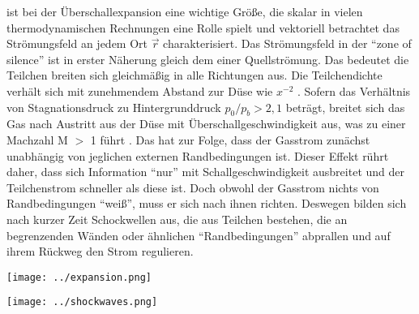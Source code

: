 ist bei der Überschallexpansion eine wichtige Größe, die skalar in vielen thermodynamischen Rechnungen eine Rolle spielt und vektoriell betrachtet das Strömungsfeld an jedem Ort $\vec{r}$ charakterisiert. Das Strömungsfeld in der \enquote{zone of silence} ist in erster Näherung gleich dem einer Quellströmung. Das bedeutet die Teilchen breiten sich gleichmäßig in alle Richtungen aus. Die Teilchendichte verhält sich mit zunehmendem Abstand zur Düse wie $x^{-2}$ \cite{hagena1981nucleation}. Sofern das Verhältnis von Stagnationsdruck zu Hintergrunddruck $p_0/p_b > 2,1$ beträgt, breitet sich das Gas nach Austritt aus der Düse mit Überschallgeschwindigkeit aus, was zu einer Machzahl \newline M $>$ 1 führt \cite{scoles1988}. Das hat zur Folge, dass der Gasstrom zunächst unabhängig von jeglichen externen Randbedingungen ist. Dieser Effekt rührt daher, dass sich Information \enquote{nur} mit Schallgeschwindigkeit ausbreitet und der Teilchenstrom schneller als diese ist. Doch obwohl der Gasstrom nichts von Randbedingungen \enquote{weiß}, muss er sich nach ihnen richten. Deswegen bilden sich nach kurzer Zeit Schockwellen aus, die aus Teilchen bestehen, die an begrenzenden Wänden oder ähnlichen \enquote{Randbedingungen} abprallen und auf ihrem Rückweg den Strom regulieren. 
%
\begin{center}
\begin{minipage}{\linewidth}
\centering
\texttt{[image: ../expansion.png]}%
 \label{fig:Machexpansion}
\end{minipage} 
\end{center} 

\begin{center}
\begin{minipage}{\linewidth}
\centering
\texttt{[image: ../shockwaves.png]}%
 \label{fig:Schockwellen}
\end{minipage} 
\end{center} 

